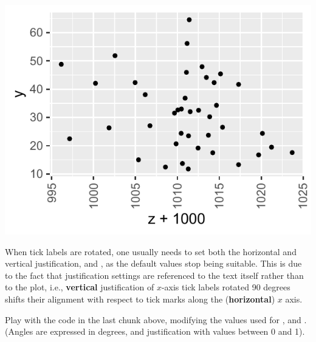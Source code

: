 \documentclass[krantz2]{krantz}\usepackage{knitr}
\begin{document}
\begin{knitrout}\footnotesize
{}\color{fgcolor}\begin{kframe}
\begin{alltt}
  \hlopt{+}  \hlopt{+}
  \hlstd{()} \hlopt{+}
  \hlstd{(} \hlopt{::}\hlstd{(} \hlstd{=} \hlstd{))} \hlopt{+}
  \hlstd{(} \hlstd{=} \hlstd{(} \hlstd{=} \hlstd{,}  \hlstd{=} \hlstd{,}  \hlstd{=} \hlstd{))}
\end{alltt}
\end{kframe}

{\centering \includegraphics[width=.54\textwidth]{figure/pos-themes-11-1} 

}



\end{knitrout}

\begin{warningbox}
When tick labels are rotated, one usually needs to set both the horizontal and vertical justification,  and , as the default values stop being suitable. This is due to the fact that justification settings are referenced to the text itself rather than to the plot, i.e., \textbf{vertical} justification of $x$-axis tick labels rotated 90 degrees shifts their alignment with respect to tick marks along the (\textbf{horizontal}) $x$ axis.
\end{warningbox}

\begin{playground}
Play with the code in the last chunk above, modifying the values used for ,  and . (Angles are expressed in degrees, and justification with values between 0 and 1).
\end{playground}
\end{document}
